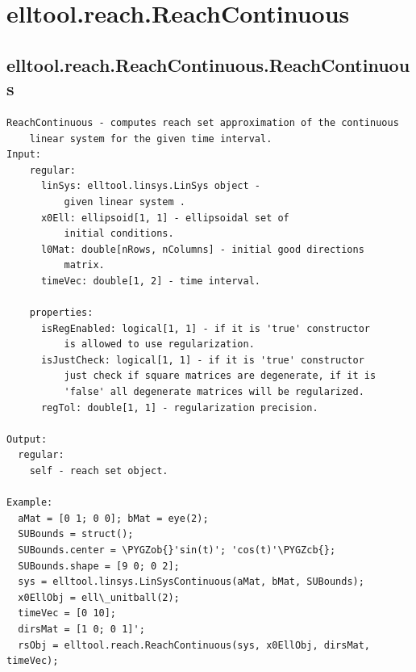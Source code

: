 \documentclass[letterpaper,10pt,english]{sphinxmanual}
\def\PYGZob{\char`\{}
\def\PYGZcb{\char`\}}
\begin{document}
\section{elltool.reach.ReachContinuous}
\label{chap_functions:elltool-reach-reachcontinuous}

\subsection{elltool.reach.ReachContinuous.ReachContinuous}
\label{chap_functions:elltool-reach-reachcontinuous-reachcontinuous}
\begin{Verbatim}[commandchars=\\\{\}]
ReachContinuous - computes reach set approximation of the continuous
    linear system for the given time interval.
Input:
    regular:
      linSys: elltool.linsys.LinSys object -
          given linear system .
      x0Ell: ellipsoid[1, 1] - ellipsoidal set of
          initial conditions.
      l0Mat: double[nRows, nColumns] - initial good directions
          matrix.
      timeVec: double[1, 2] - time interval.

    properties:
      isRegEnabled: logical[1, 1] - if it is 'true' constructor
          is allowed to use regularization.
      isJustCheck: logical[1, 1] - if it is 'true' constructor
          just check if square matrices are degenerate, if it is
          'false' all degenerate matrices will be regularized.
      regTol: double[1, 1] - regularization precision.

Output:
  regular:
    self - reach set object.

Example:
  aMat = [0 1; 0 0]; bMat = eye(2);
  SUBounds = struct();
  SUBounds.center = \PYGZob{}'sin(t)'; 'cos(t)'\PYGZcb{};
  SUBounds.shape = [9 0; 0 2];
  sys = elltool.linsys.LinSysContinuous(aMat, bMat, SUBounds);
  x0EllObj = ell\_unitball(2);
  timeVec = [0 10];
  dirsMat = [1 0; 0 1]';
  rsObj = elltool.reach.ReachContinuous(sys, x0EllObj, dirsMat, timeVec);
\end{Verbatim}
\end{document}
